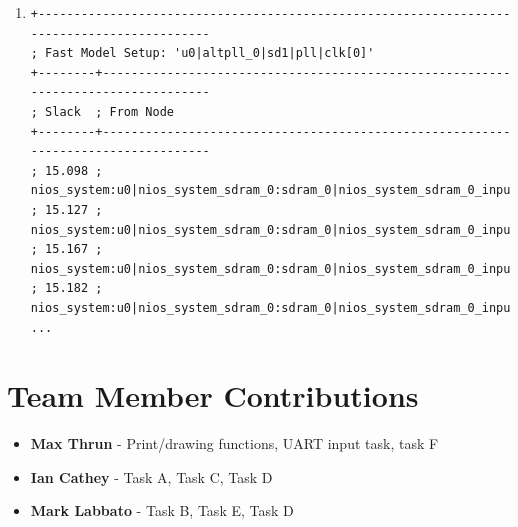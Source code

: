 \documentclass[10pt]{article}
\begin{document}
\begin{enumerate}
    \item[]
        \begin{verbatim}
+-------------------------------------------------------------------------------------------
; Fast Model Setup: 'u0|altpll_0|sd1|pll|clk[0]'                                            
+--------+----------------------------------------------------------------------------------
; Slack  ; From Node                                                                        
+--------+----------------------------------------------------------------------------------
; 15.098 ; nios_system:u0|nios_system_sdram_0:sdram_0|nios_system_sdram_0_input_efifo_module
; 15.127 ; nios_system:u0|nios_system_sdram_0:sdram_0|nios_system_sdram_0_input_efifo_module
; 15.167 ; nios_system:u0|nios_system_sdram_0:sdram_0|nios_system_sdram_0_input_efifo_module
; 15.182 ; nios_system:u0|nios_system_sdram_0:sdram_0|nios_system_sdram_0_input_efifo_module
...
        \end{verbatim}
\end{enumerate}

\section*{Team Member Contributions}
\begin{itemize}
    \item \textbf{Max Thrun} - Print/drawing functions, UART input task, task F
    \item \textbf{Ian Cathey} - Task A, Task C, Task D
    \item \textbf{Mark Labbato} - Task B, Task E, Task D
\end{itemize}
\end{document}
